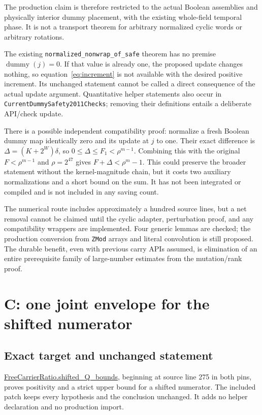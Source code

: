 \documentclass[11pt,a4paper]{article}
\newcommand{\code}[1]{\texttt{\small #1}}
\newcommand{\repo}{https://github.com/VladimirReshetnikov/ProveIt}
\newcommand{\pin}{60fcb2a69b7f1fdd4c3592ea5f164223cad50abe}
\newcommand{\src}[2]{\href{\repo/blob/\pin/Computability/DiophantineConsistency/Lean/DiophantineConsistency/#1.lean}{#2}}
\begin{document}
The production claim is therefore restricted to the actual Boolean assemblies and physically interior dummy placement, with the existing whole-field temporal phase. It is not a transport theorem for arbitrary normalized cyclic words or arbitrary rotations.

The existing \code{normalized\_nonwrap\_of\_safe} theorem has no premise $\operatorname{dummy}(j)=0$. If that value is already one, the proposed update changes nothing, so equation~\eqref{eq:increment} is not available with the desired positive increment. Its unchanged statement cannot be called a direct consequence of the actual update argument. Quantitative helper statements also occur in \code{CurrentDummySafety2011Checks}; removing their definitions entails a deliberate API/check update.

There is a possible independent compatibility proof: normalize a fresh Boolean dummy map identically zero and its update at $j$ to one. Their exact difference is $\Delta=(K+2^W)\delta$, so $0\le\Delta\le F_1<\rho^{m-1}$. Combining this with the original $F<\rho^{m-1}$ and $\rho=2^{47}$ gives $F+\Delta<\rho^m-1$. This could preserve the broader statement without the kernel-magnitude chain, but it costs two auxiliary normalizations and a short bound on the sum. It has not been integrated or compiled and is not included in any saving count.

The numerical route includes approximately a hundred source lines, but a net removal cannot be claimed until the cyclic adapter, perturbation proof, and any compatibility wrappers are implemented. Four generic lemmas are checked; the production conversion from \code{ZMod} arrays and literal convolution is still proposed. The durable benefit, even with previous carry APIs assumed, is elimination of an entire prerequisite family of large-number estimates from the mutation/rank proof.

\section{C: one joint envelope for the shifted numerator}

\subsection{Exact target and unchanged statement}

\src{FreeCarrierRatio}{FreeCarrierRatio.shifted\_Q\_bounds}, beginning at source line 275 in both pins, proves positivity and a strict upper bound for a shifted numerator. The included patch keeps every hypothesis and the conclusion unchanged. It adds no helper declaration and no production import.
\end{document}
